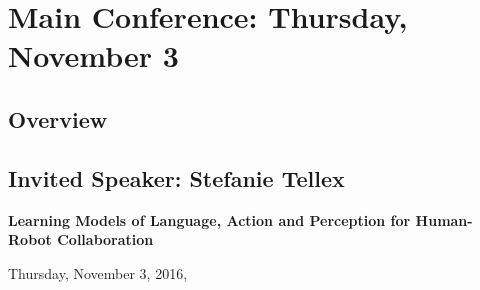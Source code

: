 %


%




\chapter{Main Conference: Thursday, November 3}
\thispagestyle{emptyheader}
\section*{Overview}

\clearpage{}

\section{Invited Speaker: Stefanie Tellex}

\begin{center}
\textbf{\Large{}Learning Models of Language, Action and Perception for Human-Robot Collaboration}{\Large{}\vspace{1em}
}
\par\end{center}{\Large \par}

\begin{center}
Thursday, November 3, 2016,  \vspace{1em}
\\
 \PlenaryLoc \\
 \vspace{1em}

\par\end{center}

